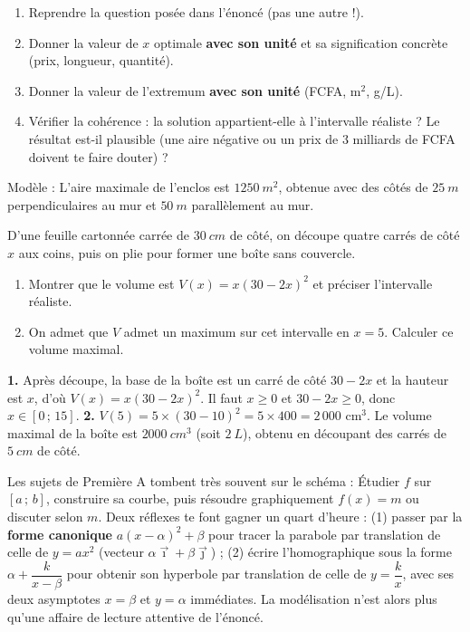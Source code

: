 \documentclass[11pt]{article}
\begin{document}
\begin{methode}
\begin{enumerate}
\item Reprendre la question posée dans l'énoncé (pas une autre !).
\item Donner la valeur de $x$ optimale \textbf{avec son unité} et sa signification concrète (prix, longueur, quantité).
\item Donner la valeur de l'extremum \textbf{avec son unité} (FCFA, m$^2$, g/L).
\item Vérifier la cohérence : la solution appartient-elle à l'intervalle réaliste ? Le résultat est-il plausible (une aire négative ou un prix de $3$ milliards de FCFA doivent te faire douter) ?
\end{enumerate}
Modèle : \og L'aire maximale de l'enclos est $\SI{1250}{m^2}$, obtenue avec des côtés de $\SI{25}{m}$ perpendiculaires au mur et $\SI{50}{m}$ parallèlement au mur. \fg{}
\end{methode}

\begin{exercice}
D'une feuille cartonnée carrée de $\SI{30}{cm}$ de côté, on découpe quatre carrés de côté $x$ aux coins, puis on plie pour former une boîte sans couvercle.
\begin{enumerate}
\item Montrer que le volume est $V(x) = x(30 - 2x)^2$ et préciser l'intervalle réaliste.
\item On admet que $V$ admet un maximum sur cet intervalle en $x = 5$. Calculer ce volume maximal.
\end{enumerate}
\end{exercice}

\begin{corrige}[Exercice 1]
\textbf{1.} Après découpe, la base de la boîte est un carré de côté $30 - 2x$ et la hauteur est $x$, d'où $V(x) = x(30-2x)^2$. Il faut $x \geq 0$ et $30 - 2x \geq 0$, donc $x \in [0\,;\,15]$.
\textbf{2.} $V(5) = 5 \times (30 - 10)^2 = 5 \times 400 = 2\,000$ cm$^3$. Le volume maximal de la boîte est $\SI{2000}{cm^3}$ (soit $\SI{2}{L}$), obtenu en découpant des carrés de $\SI{5}{cm}$ de côté.
\end{corrige}

\begin{savaistu}
Les sujets de Première A tombent très souvent sur le schéma : \og Étudier $f$ sur $[a\,;\,b]$, construire sa courbe, puis résoudre graphiquement $f(x) = m$ ou discuter selon $m$. \fg{} Deux réflexes te font gagner un quart d'heure : (1) passer par la \textbf{forme canonique} $a(x-\alpha)^2 + \beta$ pour tracer la parabole par translation de celle de $y = ax^2$ (vecteur $\alpha\vec{\imath} + \beta\vec{\jmath}$) ; (2) écrire l'homographique sous la forme $\alpha + \dfrac{k}{x - \beta}$ pour obtenir son hyperbole par translation de celle de $y = \dfrac{k}{x}$, avec ses deux asymptotes $x = \beta$ et $y = \alpha$ immédiates. La modélisation n'est alors plus qu'une affaire de lecture attentive de l'énoncé.
\end{savaistu}
\end{document}
